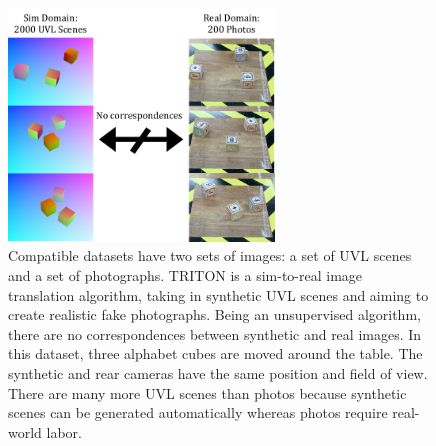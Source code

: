 \documentclass{article}
\begin{document}
\begin{figure}[H]
	\begin{center}
		\includegraphics[width=200pt]{../images/dataset_explanation.pdf}
	\end{center}
	\caption{
		Compatible datasets have two sets of images: a set of UVL scenes and a set of photographs.
		TRITON is a sim-to-real image translation algorithm, taking in synthetic UVL scenes and aiming to create realistic fake photographs. 
		Being an unsupervised algorithm, there are no correspondences between synthetic and real images.
		In this dataset, three alphabet cubes are moved around the table. 
		The synthetic and rear cameras have the same position and field of view.
		There are many more UVL scenes than photos because synthetic scenes can be generated automatically whereas photos require real-world labor.
		}
	\label{fig:dataset_explanation}
\end{figure}
\end{document}
